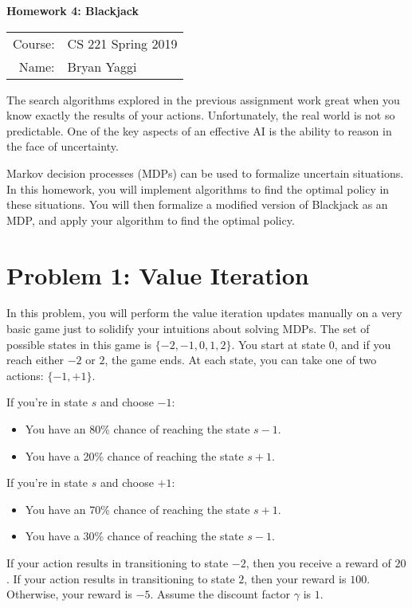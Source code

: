 \documentclass[10pt]{article}
\begin{document}
\begin{center}
{\Large \textbf{Homework 4: Blackjack}}

\begin{tabular}{rl}
\\
Course: & CS 221 Spring 2019 \\
Name: & Bryan Yaggi
\end{tabular}
\end{center}

The search algorithms explored in the previous assignment work great when you know exactly the results of your actions. Unfortunately, the real world is not so predictable. One of the key aspects of an effective AI is the ability to reason in the face of uncertainty.
\smallskip

Markov decision processes (MDPs) can be used to formalize uncertain situations. In this homework, you will implement algorithms to find the optimal policy in these situations. You will then formalize a modified version of Blackjack as an MDP, and apply your algorithm to find the optimal policy.  

\section*{\normalsize Problem 1: Value Iteration}

In this problem, you will perform the value iteration updates manually on a very basic game just to solidify your intuitions about solving MDPs. The set of possible states in this game is $\{-2, -1, 0, 1, 2\}$. You start at state $0$, and if you reach either $-2$ or $2$, the game ends. At each state, you can take one of two actions: $\{-1, +1\}$. 
\smallskip

If you're in state $s$ and choose $-1$:
\begin{itemize}
	\item You have an 80\% chance of reaching the state $s-1$.
	\item You have a 20\% chance of reaching the state $s+1$.
\end{itemize}

If you're in state $s$ and choose $+1$:
\begin{itemize}
	\item You have an 70\% chance of reaching the state $s+1$.
	\item You have a 30\% chance of reaching the state $s-1$.
\end{itemize}

If your action results in transitioning to state $-2$, then you receive a reward of $20$. If your action results in transitioning to state $2$, then your reward is $100$. Otherwise, your reward is $-5$. Assume the discount factor $\gamma$ is $1$. 
\end{document}

